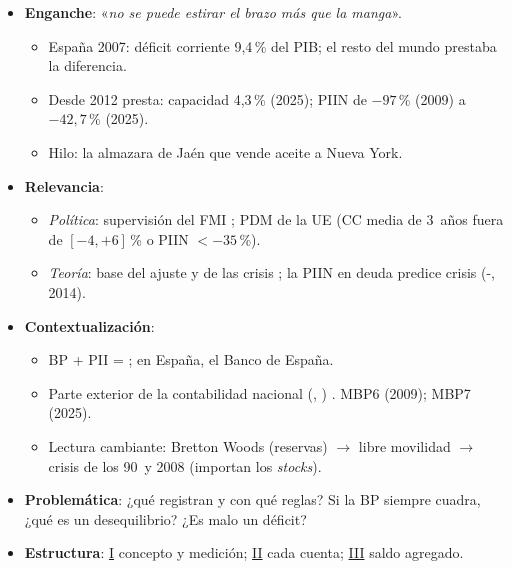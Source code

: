 \documentclass{article}
\begin{document}
\cabecerarepaso
\begin{columnas}

\begin{itemize}
\item \textbf{Enganche}: «\emph{no se puede estirar el brazo más que la manga}».
  \begin{itemize}
  \item España 2007: déficit corriente 9,4\,\% del PIB; el resto del mundo prestaba la diferencia.
  \item Desde 2012 presta: capacidad 4,3\,\% (2025); PIIN de $-97$\,\% (2009) a $-42{,}7$\,\% (2025).
  \item Hilo: la almazara de Jaén que vende aceite a Nueva York.
  \end{itemize}
\item \textbf{Relevancia}:
  \begin{itemize}
  \item \emph{Política}: supervisión del FMI ; PDM de la UE (CC media de 3~años fuera de $[-4,+6]$\,\% o PIIN $<-35$\,\%).
  \item \emph{Teoría}: base del ajuste  y de las crisis ; la PIIN en deuda predice crisis (-, 2014).
  \end{itemize}
\item \textbf{Contextualización}:
  \begin{itemize}
  \item BP + PII = ; en España, el Banco de España.
  \item Parte exterior de la contabilidad nacional (, ) . MBP6 (2009); MBP7 (2025).
  \item Lectura cambiante: Bretton Woods (reservas) $\to$ libre movilidad $\to$ crisis de los 90~y 2008 (importan los \emph{stocks}).
  \end{itemize}
\item \textbf{Problemática}: ¿qué registran y con qué reglas? Si la BP siempre cuadra, ¿qué es un desequilibrio? ¿Es malo un déficit?
\item \textbf{Estructura}: \hyperref[rep:I]{I} concepto y medición; \hyperref[rep:II]{II} cada cuenta; \hyperref[rep:III]{III} saldo agregado.
\end{itemize}


\end{columnas}
\end{document}

